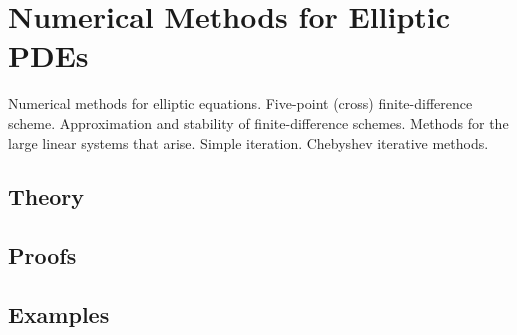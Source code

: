 
\section{Numerical Methods for Elliptic PDEs}
\label{sec:2.1.15-fd-elliptic}

\begin{ticket}
Numerical methods for elliptic equations. Five-point (cross) finite-difference scheme. Approximation and stability of finite-difference schemes. Methods for the large linear systems that arise. Simple iteration. Chebyshev iterative methods.
\end{ticket}

\subsection*{Theory}

\subsection*{Proofs}

\subsection*{Examples}
